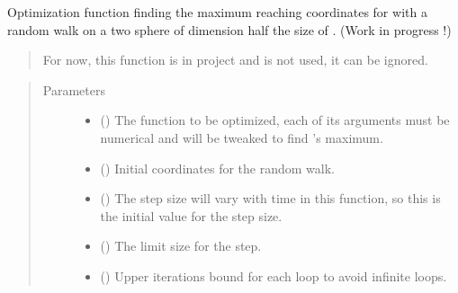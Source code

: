 \documentclass[letterpaper,10pt,english]{sphinxmanual}
\begin{document}

\begin{fulllineitems}
\label{\detokenize{opti:opti.optimize_2spheres}}
Optimization function finding the maximum reaching coordinates for 
with a random walk on a two sphere of dimension half the size of 
. (Work in progress !)
\begin{quote}

For now, this function is in project and is not used, it can be ignored.
\end{quote}
\begin{quote}\begin{description}
\item[{Parameters}] \leavevmode\begin{itemize}
\item {} 
 () \textendash{} The function to be optimized, each of its arguments must be 
numerical and will be tweaked to find ’s maximum.

\item {} 
 () \textendash{} Initial coordinates for the random walk.

\item {} 
 () \textendash{} The step size will vary with time in this function, so
this is the initial value for the step size.

\item {} 
 () \textendash{} The limit size for the step.

\item {} 
 () \textendash{} Upper iterations bound for each loop to avoid infinite 
loops.


\end{itemize}
\end{description}
\end{quote}
\end{fulllineitems}
\end{document}
